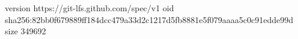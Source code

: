 version https://git-lfs.github.com/spec/v1
oid sha256:82bb0f679889ff184dcc479a33d2c1217d5fb8881e5f079aaaa5c0c91edde99d
size 349692
